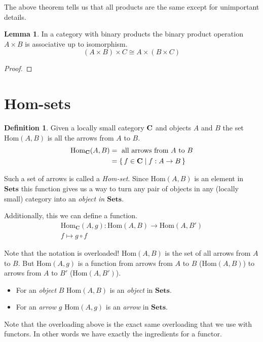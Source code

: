 \documentclass{book}
\theoremstyle{definition}
\newtheorem{definition}{Definition}[section]
\newtheorem{lemma}{Lemma}
\newcommand\Hom{\text{Hom}}
\begin{document}
The above theorem tells us that all products are the same except for unimportant
details.

\begin{lemma}
  In a category with binary products the binary product operation $A \times B$
  is associative up to isomorphism.
  \[
    (A \times B) \times C \cong A \times (B \times C)
  \]
\end{lemma}
\begin{proof}

\end{proof}

\section{Hom-sets}

\begin{definition}
  Given a locally small category $\bf{C}$ and objects $A$ and $B$ the set
  $\Hom(A, B)$ is all the arrows from $A$ to $B$.
  \begin{align*}
    \Hom_{\mathbf{C}}(A, B) &= \text{ all arrows from } A \text{ to } B \\
                          &= \set{ f \in \mathbf{C} \mid f : A \rightarrow B }
  \end{align*}
\end{definition}

Such a set of arrows is called a \emph{Hom-set}. Since $\Hom(A, B)$ is an
element in $\mathbf{Sets}$ this function gives us a way to turn any pair of
objects in any (locally small) category into an \emph{object in
  $\mathbf{Sets}$}.

Additionally, this we can define a function.
\begin{gather*}
  \Hom_{\mathbf{C}}(A, g) : \Hom(A, B) \to \Hom(A, B') \\
  f \mapsto g \circ f
\end{gather*}

Note that the notation is overloaded! $\Hom(A, B)$ is the set of all arrows from
$A$ to $B$. But $\Hom(A, g)$ is a function from arrows from $A$ to $B$
($\Hom(A, B)$) to arrows from $A$ to $B'$ ($\Hom(A, B')$).
\begin{itemize}
\item For an \emph{object} $B$ $\Hom(A, B)$ is an \emph{object} in $\mathbf{Sets}$.
\item For an \emph{arrow} $g$ $\Hom(A, g)$ is an \emph{arrow} in $\mathbf{Sets}$.
\end{itemize}
Note that the overloading above is the exact same overloading that we use with
functors. In other words we have exactly the ingredients for a functor.
\end{document}

